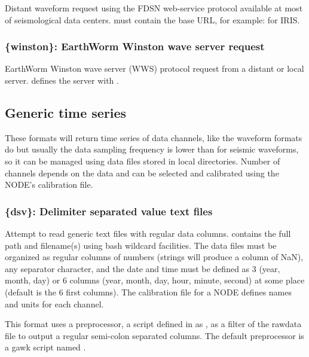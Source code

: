Distant waveform request using the FDSN web-service protocol available at most of seismological data centers.  must contain the base URL, for example:  for IRIS.

\subsubsection{\{winston\}: EarthWorm Winston wave server request}

EarthWorm Winston wave server (WWS) protocol request from a distant or local server.  defines the server with .


\subsection{Generic time series}
\label{timeseries}

These formats will return time series of data channels, like the waveform formats do but usually the data sampling frequency is lower than for seismic waveforms, so it can be managed using data files stored in local directories. Number of channels depends on the data and can be selected and calibrated using the NODE's calibration file.

\subsubsection{\{dsv\}: Delimiter separated value text files}

Attempt to read generic text files with regular data columns.  contains the full path and filename(s) using bash wildcard facilities. The data files must be organized as regular columns of numbers (strings will produce a column of NaN), any separator character, and the date and time must be defined as 3 (year, month, day) or 6 columns (year, month, day, hour, minute, second) at some place (default is the 6 first columns). The calibration file for a NODE defines names and units for each channel.

This format uses a preprocessor, a script defined in  as , as a filter of the rawdata file to output a regular semi-colon separated columns. The default preprocessor is a gawk script named .

